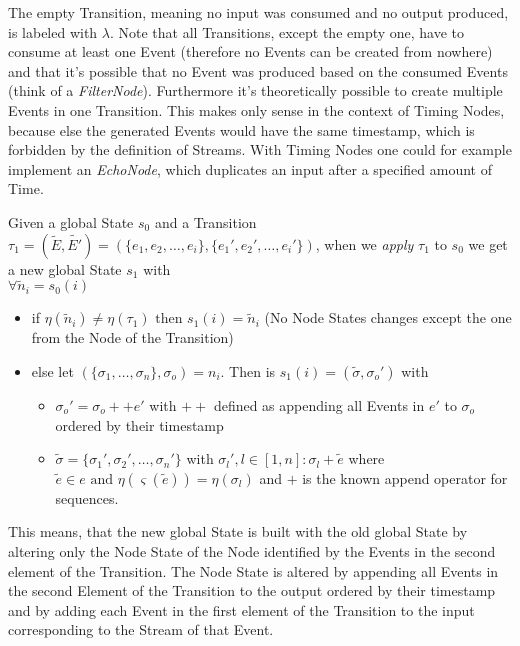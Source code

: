 The empty Transition, meaning no input was consumed and no output produced, is labeled with \(\lambda\).
Note that all Transitions, except the empty one, have to consume at least one Event (therefore no Events can be created from nowhere) and that it's possible that no Event was produced based on the consumed Events (think of a \emph{FilterNode}).
Furthermore it's theoretically possible to create multiple Events in one Transition.
This makes only sense in the context of Timing Nodes, because else the generated Events would have the same timestamp, which is forbidden by the definition of Streams.
With Timing Nodes one could for example implement an \emph{EchoNode}, which duplicates an input after a specified amount of Time.

\begin{definition}[name = Application of a Transition on a State]\label{sec:concepts:def:application_transition}
  Given a global State \(s_0\) and a Transition \(\tau_1 = (\widetilde{E}, \widetilde{E'}) = (\{e_1,e_2,\dots,e_i\}, \{e_1',e_2',\dots,e_i'\})\), when we \emph{apply} \(\tau_1\) to \(s_0\) we get a new global State \(s_1\) with\\
  \(\forall \widetilde{n}_i = s_0(i)\)
  \begin{itemize}
    \item if \(\eta(\widetilde{n}_i) \neq \eta(\tau_1) \text{ then } s_1(i) = \widetilde{n}_i\) (No Node States changes except the one from the Node of the Transition)
    \item else let \((\{\sigma_1,\dots,\sigma_n\}, \sigma_o) = n_i\). Then is \(s_1(i) = (\widetilde{\sigma}, \sigma_o')\) with
      \begin{itemize}
        \item \(\sigma_o' = \sigma_o ++ e'\) with \(++\) defined as appending all Events in \(e'\) to \(\sigma_o\) ordered by their timestamp
        \item \(\widetilde{\sigma} = \{\sigma_1', \sigma_2', \dots, \sigma_n'\}\) with \(\sigma_l', l \in [1,n]: \sigma_l + \widetilde{e}\) where \(\widetilde{e} \in e \text{ and } \eta(\varsigma(\widetilde{e})) = \eta(\sigma_l)\) and \(+\) is the known append operator for sequences.
      \end{itemize}
  \end{itemize}

\end{definition}
This means, that the new global State is built with the old global State by altering only the Node State of the Node identified by the Events in the second element of the Transition.
The Node State is altered by appending all Events in the second Element of the Transition to the output ordered by their timestamp and by adding each Event in the first element of the Transition to the input corresponding to the Stream of that Event.

